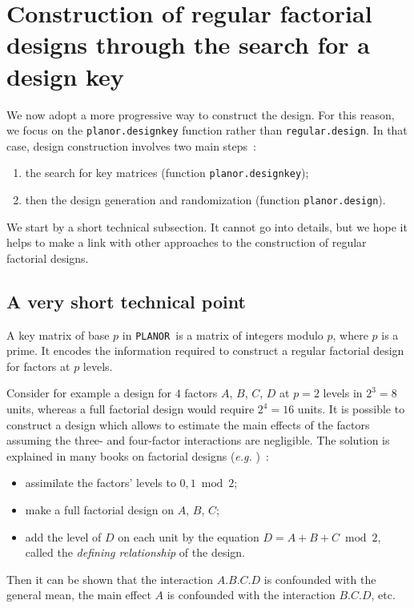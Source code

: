 \documentclass[a4paper]{article}
\newcommand{\PLANOR}{\texttt{PLANOR }}
\begin{document}
\section{Construction of regular factorial designs through the search for a
  design key}
We now adopt a more progressive way to construct the design. For this
reason, we focus on the \texttt{planor.designkey} function rather than
\texttt{regular.design}. In that case, design construction involves
two main steps~:
\begin{enumerate}
\item the search for key matrices (function \texttt{planor.designkey});
\item then the design generation and randomization (function \texttt{planor.design}).
\end{enumerate}
We start by a short technical subsection. It cannot go
into details, but we hope it helps to make a link with other
approaches to the construction of regular factorial designs.

\subsection{A very short technical point}
A key matrix of base $p$ in \PLANOR is a matrix of integers modulo
$p$, where $p$ is a prime. It encodes the information required to
construct a regular factorial design for factors at $p$
levels. 

Consider for example a design for $4$ factors $A$, $B$, $C$, $D$ at
$p=2$ levels in $2^3=8$ units, whereas a full factorial design would
require $2^4=16$ units. It is possible to construct a design which
allows to estimate the main effects of the factors assuming the three-
and four-factor interactions are negligible. The solution is explained
in many books on factorial designs (\emph{e.g.} \cite{boxhun78})~:
\begin{itemize}
\item assimilate the factors' levels to $0, 1 \bmod 2$;
\item make a full factorial design on $A$, $B$, $C$;
\item add the level of $D$ on each unit by the equation $D=A+B+C \bmod
  2$, called the \emph{defining relationship} of the design.
\end{itemize}
Then it can be shown that the interaction $A.B.C.D$ is confounded with
the general mean, the main effect $A$ is confounded with the
interaction $B.C.D$, etc.
\end{document}
